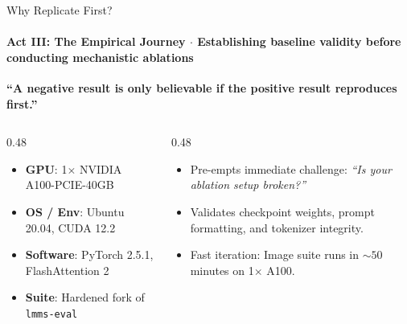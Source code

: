 \documentclass[aspectratio=169, 10pt]{beamer}
\begin{document}

\begin{frame}{Why Replicate First?}
  \framesubtitle{Act III: The Empirical Journey $\cdot$ Establishing baseline validity before conducting mechanistic ablations}
  
  \vspace{4pt}
  \begin{center}
    \begin{tcolorbox}[accentcard, width=0.88\textwidth]
      \centering \Large \textbf{``A negative result is only believable if the positive result reproduces first.''}
    \end{tcolorbox}
  \end{center}
  
  \vspace{6pt}
  \begin{columns}[T]
    \begin{column}{0.48\textwidth}
      \begin{tcolorbox}[metriccard, title=\textbf{Controlled Evaluation Hardware}]
        \small
        \begin{itemize}\setlength{\itemsep}{2pt}
          \item \textbf{GPU}: 1$\times$ NVIDIA A100-PCIE-40GB
          \item \textbf{OS / Env}: Ubuntu 20.04, CUDA 12.2
          \item \textbf{Software}: PyTorch 2.5.1, FlashAttention 2
          \item \textbf{Suite}: Hardened fork of \texttt{lmms-eval}
        \end{itemize}
      \end{tcolorbox}
    \end{column}
    \begin{column}{0.48\textwidth}
      \begin{tcolorbox}[metriccard, title=\textbf{Strategic Validity Argument}]
        \small
        \begin{itemize}\setlength{\itemsep}{2pt}
          \item Pre-empts immediate challenge: \textit{``Is your ablation setup broken?''}
          \item Validates checkpoint weights, prompt formatting, and tokenizer integrity.
          \item Fast iteration: Image suite runs in $\sim 50$ minutes on 1$\times$ A100.
        \end{itemize}
      \end{tcolorbox}
    \end{column}
  \end{columns}

\end{frame}
\end{document}
